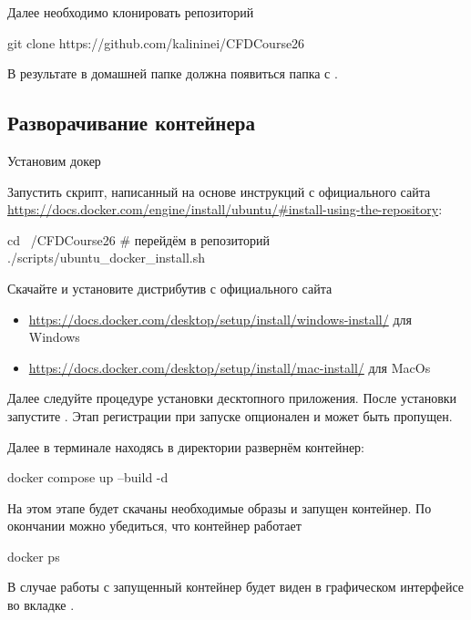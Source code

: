 Далее необходимо клонировать репозиторий

\begin{shelloutput}
git clone https://github.com/kalininei/CFDCourse26
\end{shelloutput}

В результате в домашней папке должна появиться папка с .

\subsection{Разворачивание контейнера}

Установим докер

\begin{tcolorbox}[osstyle, title=Ubuntu+apt]
Запустить скрипт, написанный на основе инструкций с официального сайта \url{https://docs.docker.com/engine/install/ubuntu/#install-using-the-repository}:
\begin{shelloutput}
cd ~/CFDCourse26    # перейдём в репозиторий
./scripts/ubuntu_docker_install.sh
\end{shelloutput}
\end{tcolorbox}

\begin{tcolorbox}[osstyle, title=Windows/MacOs+DockerDesktop]
Скачайте и установите дистрибутив с официального сайта 
\begin{itemize}
\item \url{https://docs.docker.com/desktop/setup/install/windows-install/} для Windows
\item \url{https://docs.docker.com/desktop/setup/install/mac-install/} для MacOs
\end{itemize}
Далее следуйте процедуре установки десктопного приложения.
После установки запустите .
Этап регистрации при запуске опционален и может быть пропущен.
\end{tcolorbox}

Далее в терминале находясь в директории  развернём контейнер:
\begin{shelloutput}
docker compose up --build -d
\end{shelloutput}
На этом этапе будет скачаны необходимые образы и запущен контейнер.
По окончании можно убедиться, что контейнер работает
\begin{shelloutput}
docker ps
\end{shelloutput}
В случае работы с  запущенный контейнер будет виден в графическом интерфейсе во вкладке .

